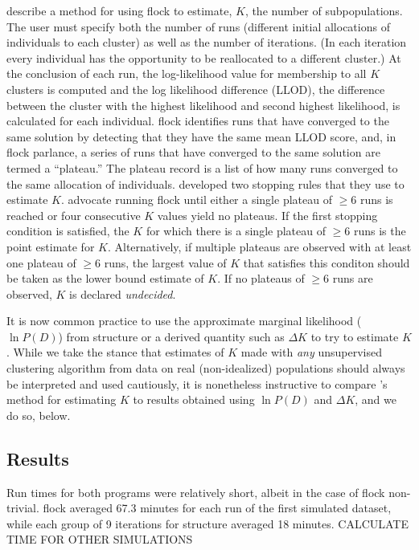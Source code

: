 \citet{Duc&Tur2012} describe a method for using {\sc flock} to estimate, $K$, the number of
subpopulations. The user must specify both the number of runs (different initial allocations of individuals 
to each cluster) as well as the number of iterations. (In each iteration every individual has the opportunity to be reallocated 
to a different cluster.) At the conclusion of each run, the log-likelihood value for membership to all $K$ clusters is computed
and the log likelihood difference (LLOD), the difference between the cluster with the highest likelihood 
and second highest likelihood, is calculated for each individual. {\sc flock} identifies runs that 
have converged to the same solution by detecting that they have the same mean LLOD score, and, in 
{\sc flock} parlance, a series of runs that have converged to the same solution are termed a ``plateau.'' 
The plateau record is a list of how many runs converged to the same allocation
of individuals. 
\citet{Duc&Tur2012} developed two stopping rules that they use to estimate $K$.\citet{Duc&Tur2012} advocate running  {\sc flock} until either a single plateau of
$\geq 6$ runs is reached or four consecutive $K$ values yield no plateaus. If the first stopping condition is satisfied,
the $K$ for which there is a single plateau of $\geq 6$ runs is the point estimate for $K$. Alternatively, 
if multiple plateaus are observed with at least one plateau of $\geq 6$ runs, the largest value of $K$ that satisfies 
this conditon should be taken as the lower bound estimate of $K$. If no plateaus of $\geq 6$ runs are observed, $K$
is declared {\em undecided}.  
 
It is now common practice to use the approximate marginal likelihood ($\ln P(D)$) from {\sc structure}
or a derived quantity such as $\Delta K$ \citep{Evannoetal2005} to try to estimate $K$.
While we take the stance that estimates of $K$ made with {\em any} unsupervised clustering algorithm
from data on real (non-idealized) populations should always be interpreted and used
cautiously, it is nonetheless instructive to compare \citet{Duc&Tur2012}'s method for
estimating $K$ to results obtained using $\ln P(D)$ and $\Delta K$, and we do so, below. 

\subsection*{Results} 
Run times for both programs were relatively short, albeit in the case of {\sc flock} 
non-trivial. {\sc flock} averaged 67.3 minutes
for each run of the first simulated dataset, while each group of 
9 iterations for {\sc structure} averaged 18 minutes. CALCULATE
TIME FOR OTHER SIMULATIONS
 
